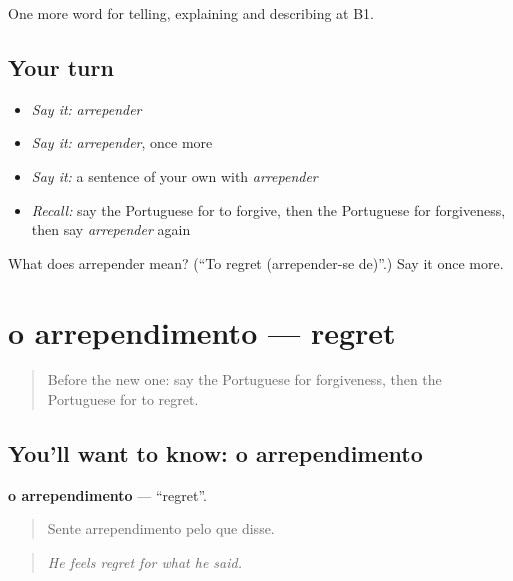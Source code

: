 \begin{grammarlens}[title={What you've built}]
One more word for telling, explaining and describing at B1.
\end{grammarlens}

\subsection*{Your turn}
\begin{itemize}
\raggedright
  \item \emph{Say it:} \emph{arrepender}
  \item \emph{Say it:} \emph{arrepender}, once more
  \item \emph{Say it:} a sentence of your own with \emph{arrepender}
  \item \emph{Recall:} say the Portuguese for to forgive, then the Portuguese for forgiveness, then say \emph{arrepender} again
\end{itemize}

\begin{tcolorbox}[breakable,colback=teal!4,colframe=teal!35!black,title={Before you move on}]
What does arrepender mean? (\textquotedblleft{}To regret (arrepender-se de)\textquotedblright{}.) Say it once more.
\end{tcolorbox}
\section[o arrependimento]{o arrependimento — regret}

\label{lesson:PT-C480-arrependimento}



\begin{quote}
Before the new one: say the Portuguese for forgiveness, then the Portuguese for to regret.
\end{quote}

\subsection*{You'll want to know: o arrependimento}
\textbf{o arrependimento} — \textquotedblleft{}regret\textquotedblright{}.

\begin{quote}
Sente arrependimento pelo que disse.
\end{quote}

\begin{quote}
\emph{He feels regret for what he said.}
\end{quote}

